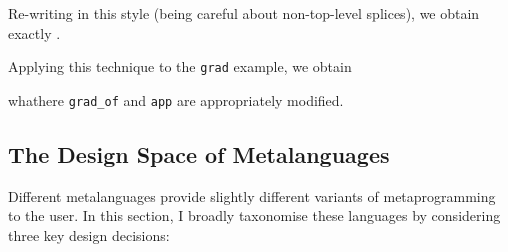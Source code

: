Re-writing  in this style (being careful about non-top-level splices), we obtain exactly .

Applying this technique to the \texttt{grad} example, we obtain
whathere \texttt{grad_of} and \texttt{app} are appropriately modified.
\subsection{The Design Space of Metalanguages}\label{subsection:metaprogramming-design}
Different metalanguages provide slightly different variants of metaprogramming to the user. In this section, I broadly taxonomise these languages by considering three key design decisions:
